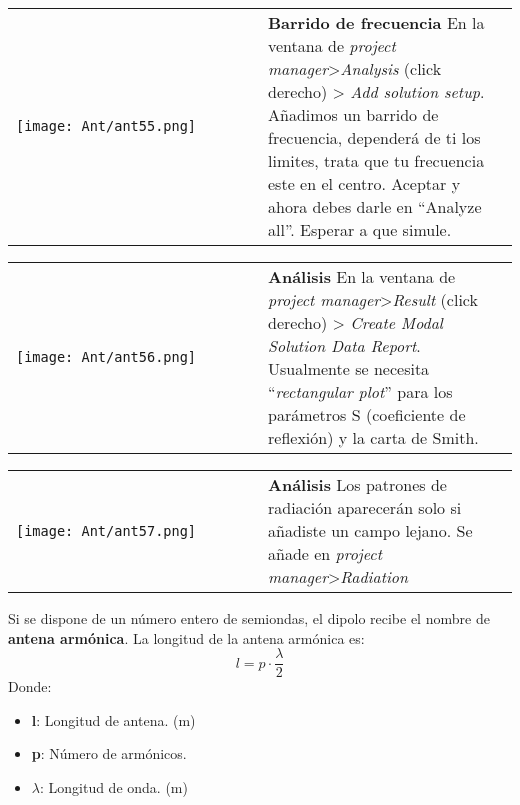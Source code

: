 \documentclass[
	12pt, %
	fleqn, %
	a4paper, %
	oneside, %
]{LegrandOrangeBook}
\begin{document}
\begin{tabular}{k{0.5\linewidth}  j{0.5\linewidth}}
        \texttt{[image: Ant/ant55.png]} & \textbf{Barrido de frecuencia} \newline 
        En la ventana de \textit{project manager}>\textit{Analysis} (click derecho) > \textit{Add solution setup}. Añadimos un barrido de frecuencia, dependerá de ti los limites, trata que tu frecuencia este en el centro. Aceptar y ahora debes darle en ``Analyze all''. Esperar a que simule.
\end{tabular}
\begin{tabular}{k{0.5\linewidth}  j{0.5\linewidth}}
        \texttt{[image: Ant/ant56.png]} & \textbf{Análisis} \newline 
        En la ventana de \textit{project manager}>\textit{Result} (click derecho) > \textit{Create Modal Solution Data Report}. Usualmente se necesita ``\textit{rectangular plot}'' para los parámetros S (coeficiente de reflexión) y la carta de Smith. 
\end{tabular}
\begin{tabular}{k{0.5\linewidth}  j{0.5\linewidth}}
        \texttt{[image: Ant/ant57.png]} & \textbf{Análisis} \newline 
        Los patrones de radiación aparecerán solo si añadiste un campo lejano. Se añade en \textit{project manager}>\textit{Radiation}
\end{tabular}
\begin{definition}
Si se dispone de un número entero de semiondas, el dipolo recibe el nombre de \textbf{antena armónica}. La longitud de la antena armónica es:
\begin{equation}
l=p\cdot \frac{\lambda}{2}
\label{eq:long ant armo}
\end{equation}
Donde:
\begin{itemize}
\item \textbf{l}: Longitud de antena. (m)
\item \textbf{p}: Número de armónicos.
\item $\lambda$: Longitud de onda. (m)
\end{itemize}
\end{definition}
\end{document}
